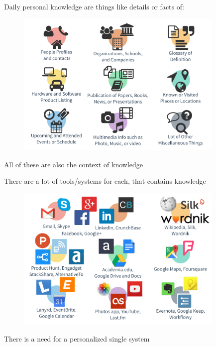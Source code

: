 \documentclass[10pt, compress]{beamer}
\begin{document}
\begin{frame}[fragile]
  \centering

  \alert{Daily personal knowledge} are things like details or facts of:

  \begin{figure}[ht]
    \includegraphics[width=10cm]{include/knowledge-daily.png}
  \end{figure}

  All of these are also the \alert{context of knowledge}

\end{frame}


\begin{frame}[fragile]
  \centering

  There are a \alert{lot of tools/systems} for each, that contains knowledge

  \begin{figure}[ht]
    \includegraphics[width=10cm]{include/knowledge-tools.png}
  \end{figure}

  There is a \alert{need for a personalized single system}

\end{frame}
\end{document}
